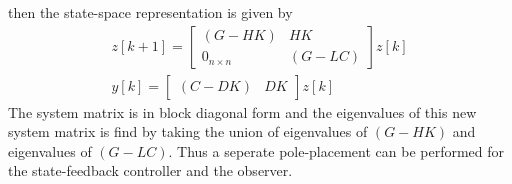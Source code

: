\documentclass[twoside]{article}
\begin{document}
then the state-space representation is given by
%
\begin{align*}
  z[k+1] = \left[ \begin{array}{cc} (G - H K) & H K\\ 0_{n \times n}
                                              & (G - LC) \end{array}
                                                \right] z[k]
\\
 y[k] = \left[ \begin{array}{cc} (C - DK) & D K \end{array}
                                                \right] z[k]
\end{align*}
%
The system matrix is in block diagonal form and the eigenvalues
of this new system matrix is find by taking the union of eigenvalues
of $(G - H K)$ and eigenvalues of $(G - L C)$. Thus a seperate
pole-placement can be performed for the state-feedback controller
and the observer. 



\end{document}
